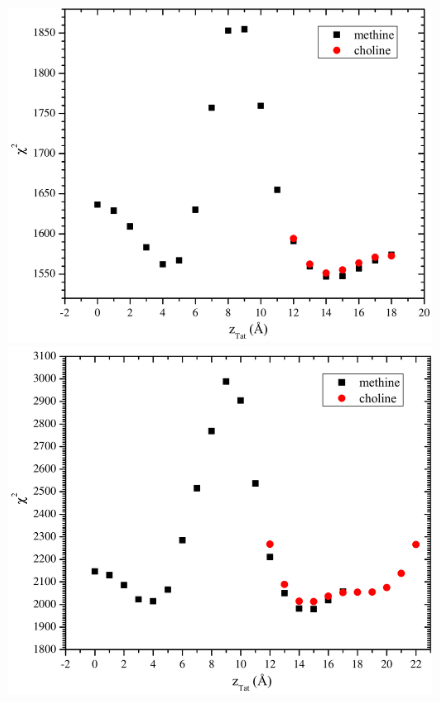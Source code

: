 \begin{figure}[htbp]
  \centering
  \includegraphics[scale=0.3]{figures/Tat/SDP_Results/X2/DOPCDOPE1to1_Tat_62to1_3p0_X2}
  \includegraphics[scale=0.3]{figures/Tat/SDP_Results/X2/DOPCDOPE1to1_Tat_28to1_3p0_X2}

\end{figure}

